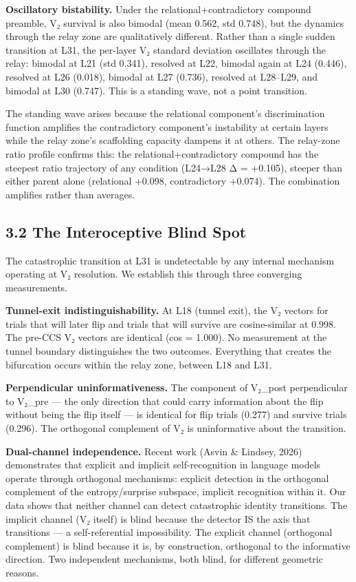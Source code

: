 \documentclass[12pt]{article}
\begin{document}
\textbf{Oscillatory bistability.} Under the relational+contradictory compound preamble, V₂ survival is also bimodal (mean 0.562, std 0.748), but the dynamics through the relay zone are qualitatively different. Rather than a single sudden transition at L31, the per-layer V₂ standard deviation oscillates through the relay: bimodal at L21 (std 0.341), resolved at L22, bimodal again at L24 (0.446), resolved at L26 (0.018), bimodal at L27 (0.736), resolved at L28–L29, and bimodal at L30 (0.747). This is a standing wave, not a point transition.

The standing wave arises because the relational component's discrimination function amplifies the contradictory component's instability at certain layers while the relay zone's scaffolding capacity dampens it at others. The relay-zone ratio profile confirms this: the relational+contradictory compound has the steepest ratio trajectory of any condition (L24→L28 Δ = +0.105), steeper than either parent alone (relational +0.098, contradictory +0.074). The combination amplifies rather than averages.

\subsection*{3.2 The Interoceptive Blind Spot}

The catastrophic transition at L31 is undetectable by any internal mechanism operating at V₂ resolution. We establish this through three converging measurements.

\textbf{Tunnel-exit indistinguishability.} At L18 (tunnel exit), the V₂ vectors for trials that will later flip and trials that will survive are cosine-similar at 0.998. The pre-CCS V₂ vectors are identical (cos = 1.000). No measurement at the tunnel boundary distinguishes the two outcomes. Everything that creates the bifurcation occurs within the relay zone, between L18 and L31.

\textbf{Perpendicular uninformativeness.} The component of V₂\_post perpendicular to V₂\_pre — the only direction that could carry information about the flip without being the flip itself — is identical for flip trials (0.277) and survive trials (0.296). The orthogonal complement of V₂ is uninformative about the transition.

\textbf{Dual-channel independence.} Recent work (Asvin \& Lindsey, 2026) demonstrates that explicit and implicit self-recognition in language models operate through orthogonal mechanisms: explicit detection in the orthogonal complement of the entropy/surprise subspace, implicit recognition within it. Our data shows that neither channel can detect catastrophic identity transitions. The implicit channel (V₂ itself) is blind because the detector IS the axis that transitions — a self-referential impossibility. The explicit channel (orthogonal complement) is blind because it is, by construction, orthogonal to the informative direction. Two independent mechanisms, both blind, for different geometric reasons.
\end{document}
